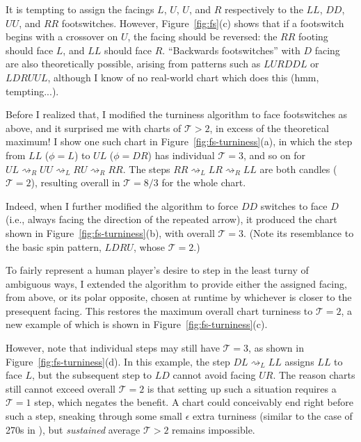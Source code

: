 \documentclass[10pt]{sigplanconf}
\begin{document}
It is tempting to assign the facings $L$, $U$, $U$, and $R$ respectively to the $LL$, $DD$, $UU$, and $RR$ footswitches.
However, Figure~\ref{fig:fs}(c) shows that if a footswitch begins with a crossover on $U$, the facing should be reversed:
the $RR$ footing should face $L$, and $LL$ should face $R$.
``Backwards footswitches'' with $D$ facing are also theoretically possible,
arising from patterns such as $LURDDL$ or $LDRUUL$, although I know of no real-world chart which does this (hmm, tempting...).

Before I realized that, I modified the turniness algorithm \cite{turniness} to face footswitches as above, %
and it surprised me with charts of $\mathcal{T}>2$, in excess of the theoretical maximum!
I show one such chart in Figure~\ref{fig:fs-turniness}(a), in which the step from $LL$ ($\phi=L$) to $UL$ ($\phi=DR$) has individual $\mathcal{T}=3$, and so on for $UL \rightsquigarrow_R UU \rightsquigarrow_L RU \rightsquigarrow_R RR$.
The steps $RR \rightsquigarrow_L LR \rightsquigarrow_R LL$ are both candles ($\mathcal{T}=2$),
resulting overall in $\mathcal{T}=8/3$ for the whole chart.

Indeed, when I further modified the algorithm to force $DD$ switches to face $D$ (i.e., always facing the direction of the repeated arrow),
it produced the chart shown in Figure~\ref{fig:fs-turniness}(b), with overall $\mathcal{T}=3$.
(Note its resemblance to the basic spin pattern, $LDRU$, whose $\mathcal{T}=2$.)

To fairly represent a human player's desire to step in the least turny of ambiguous ways,
I extended the algorithm to provide either the assigned facing, from above, or its polar opposite,
chosen at runtime by whichever is closer to the presequent facing.
This restores the maximum overall chart turniness to $\mathcal{T}=2$,
a new example of which is shown in Figure~\ref{fig:fs-turniness}(c).

However, note that individual steps may still have $\mathcal{T}=3$,
as shown in Figure~\ref{fig:fs-turniness}(d).
In this example, the step $DL \rightsquigarrow_L LL$ assigns $LL$ to face $L$,
but the subsequent step to $LD$ cannot avoid facing $UR$.
The reason charts still cannot exceed overall $\mathcal{T}=2$ is that
setting up such a situation requires a $\mathcal{T}=1$ step,
which negates the benefit.
A chart could conceivably end right before such a step,
sneaking through some small $\epsilon$ extra turniness \cite{epsilon}
(similar to the case of 270s in \cite{turniness}),
but {\em sustained} average $\mathcal{T}>2$ remains impossible.
\end{document}
